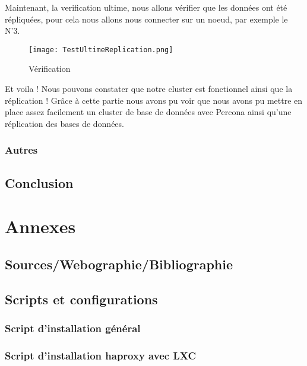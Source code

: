\documentclass[a4paper,10pt,one side,titlepage]{report}
\begin{document}
Maintenant, la verification ultime, nous allons vérifier que les données ont été
répliquées, pour cela nous allons nous connecter sur un noeud, par exemple le N'3.
\begin{figure}[H]
    \centering
\texttt{[image: TestUltimeReplication.png]} 
\caption{Vérification}
    \label{fig:Testrepli4}
\end{figure} 
Et voila ! Nous pouvons constater que notre cluster est fonctionnel ainsi que la réplication ! Grâce à cette partie nous avons pu voir que nous avons pu mettre en place assez facilement un cluster de base de données avec Percona ainsi qu'une réplication des bases de données.

%


\section{Autres}



\chapter{Conclusion}


\part{Annexes}
\chapter{Sources/Webographie/Bibliographie}



\chapter{Scripts et configurations}

\section{Script d'installation général}
\label{lst:bashinstall}


\section{Script d'installation haproxy avec LXC}
\label{lst:scriptha}

\end{document}
